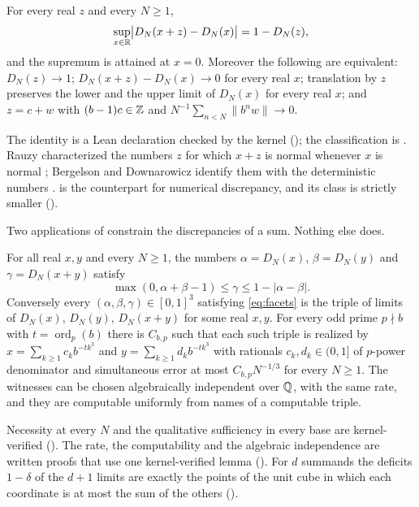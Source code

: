 \documentclass[11pt]{article}
\newcommand{\dist}[1]{\lVert #1\rVert}
\DeclareMathOperator{\ord}{ord}
\begin{document}
\begin{maintheorem}\label{thm:A}
For every real $z$ and every $N\ge1$,
\[
\sup_{x\in\mathbb R}\bigl|D_N(x+z)-D_N(x)\bigr|=1-D_N(z),
\]
and the supremum is attained at $x=0$. Moreover the following are equivalent: $D_N(z)\to1$;
$D_N(x+z)-D_N(x)\to0$ for every real $x$; translation by $z$ preserves the lower and the upper
limit of $D_N(x)$ for every real $x$; and $z=c+w$ with $(b-1)c\in\mathbb Z$ and
$N^{-1}\sum_{n<N}\dist{b^nw}\to0$.
\end{maintheorem}

The identity is a Lean declaration checked by the kernel (); the classification is
. Rauzy characterized the numbers $z$ for which $x+z$ is normal whenever $x$ is
normal \cite{Rauzy76}; Bergelson and Downarowicz identify them with the deterministic numbers
\cite[Definitions~3.5 and~3.10, Theorem~3.12]{BD25}.  is the counterpart for numerical
discrepancy, and its class is strictly smaller ().

Two applications of  constrain the discrepancies of a sum. Nothing else does.

\begin{maintheorem}\label{thm:B}
For all real $x,y$ and every $N\ge1$, the numbers $\alpha=D_N(x)$, $\beta=D_N(y)$ and
$\gamma=D_N(x+y)$ satisfy
\begin{equation}\label{eq:facets}
\max(0,\alpha+\beta-1)\le\gamma\le1-|\alpha-\beta| .
\end{equation}
Conversely every $(\alpha,\beta,\gamma)\in[0,1]^3$ satisfying \eqref{eq:facets} is the triple of
limits of $D_N(x)$, $D_N(y)$, $D_N(x+y)$ for some real $x,y$. For every odd prime $p\nmid b$ with
$t=\ord_p(b)$ there is $C_{b,p}$ such that each such triple is realized by
$x=\sum_{k\ge1}c_kb^{-tk^3}$ and $y=\sum_{k\ge1}d_kb^{-tk^3}$ with rationals $c_k,d_k\in(0,1]$ of $p$-power
denominator and simultaneous error at most $C_{b,p}N^{-1/3}$ for every $N\ge1$. The witnesses can
be chosen algebraically independent over $\mathbb Q$, with the same rate, and they are computable
uniformly from names of a computable triple.
\end{maintheorem}

Necessity at every $N$ and the qualitative sufficiency in every base are kernel-verified
(). The rate, the computability and the algebraic independence are written
proofs that use one kernel-verified lemma (). For $d$
summands the deficits $1-\delta$ of the $d+1$ limits are exactly the points of the unit cube in which
each coordinate is at most the sum of the others ().
\end{document}
